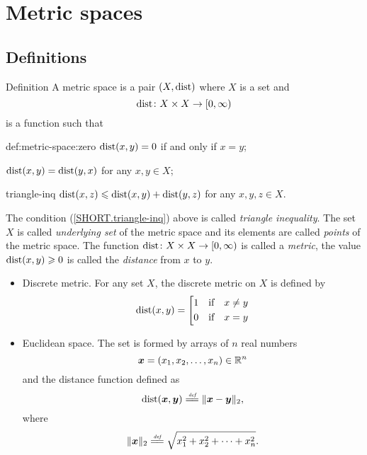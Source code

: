 \chapter{Metric spaces}\label{chap:metr}
\section{Definitions}

\begin{thm}{Definition}
\label{def:metric-space}
A metric space is a pair $(X,\operatorname{dist})$ where $X$ is a set and 
$$\operatorname{dist} \colon X \times X \rightarrow [0,\infty)$$
is a function such that 

\begin{subthm}{def:metric-space:zero}
$\operatorname{dist}(x,y) = 0$ if and only if $x=y$;
\end{subthm}

\begin{subthm}{}
$\operatorname{dist}(x,y) = \operatorname{dist}(y,x)$ for any $x, y \in X$;
\end{subthm}

\begin{subthm}{triangle-inq}
$\operatorname{dist}(x,z)\leqslant \operatorname{dist}(x,y)+\operatorname{dist}(y,z)$ for any $x, y, z \in X$.
\end{subthm}

\end{thm}

The condition (\ref{SHORT.triangle-inq}) above is called \emph{triangle inequality}.
The set $X$ is called \emph{underlying set} of the metric space
and its elements are called \emph{points} of the metric space.
The function $\operatorname{dist}\colon X \times X \rightarrow [0,\infty)$ is called a \emph{metric}, 
the value $\operatorname{dist}(x,y)\geqslant 0$ is called the \emph{distance} from $x$ to $y$.



\begin{itemize}
\item Discrete metric. For any set $X$, the discrete metric on $X$ is defined by 
$$\operatorname{dist}(x,y)=\left[
\begin{aligned}
&1&&\text{if}&x&\not=y
\\
&0&&\text{if}&x&=y
\end{aligned}
\right.$$

\item Euclidean space. 
The set is formed by arrays of $n$ real numbers
$$\bm{x}=(x_1,x_2,\dots,x_n)\in\mathbb{R}^n$$
and the distance function defined as 
$$\Dist(\bm{x},\bm{y})
\df
\lVert\bm{x}-\bm{y}\rVert_2,$$
where 
$$\lVert\bm{x}\rVert_2
\df
\sqrt{x^2_1+x^2_2+\dots+x_n^2}.
$$
\end{itemize}

